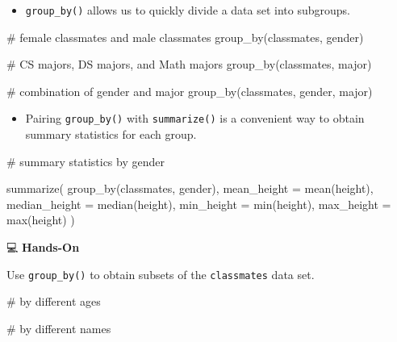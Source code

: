 \documentclass[
  letterpaper,
  DIV=11,
  numbers=noendperiod]{scrreprt}
\newenvironment{Shaded}{\begin{snugshade}}{\end{snugshade}}
\newcommand{\AttributeTok}[1]{\textcolor[rgb]{0.40,0.45,0.13}{#1}}
\newcommand{\CommentTok}[1]{\textcolor[rgb]{0.37,0.37,0.37}{#1}}
\newcommand{\FunctionTok}[1]{\textcolor[rgb]{0.28,0.35,0.67}{#1}}
\newcommand{\NormalTok}[1]{\textcolor[rgb]{0.00,0.23,0.31}{#1}}
\providecommand{\tightlist}{%
  \setlength{\itemsep}{0pt}\setlength{\parskip}{0pt}}\usepackage{longtable,booktabs,array}
\begin{document}
\begin{itemize}
\tightlist
\item
  \texttt{group\_by()} allows us to quickly divide a data set into
  subgroups.
\end{itemize}

\begin{Shaded}
\begin{Highlighting}[]
\CommentTok{\# female classmates and male classmates}
\FunctionTok{group\_by}\NormalTok{(classmates, gender)}

\CommentTok{\# CS majors, DS majors, and Math majors}
\FunctionTok{group\_by}\NormalTok{(classmates, major)}

\CommentTok{\# combination of gender and major}
\FunctionTok{group\_by}\NormalTok{(classmates, gender, major)}
\end{Highlighting}
\end{Shaded}

\begin{itemize}
\tightlist
\item
  Pairing \texttt{group\_by()} with \texttt{summarize()} is a convenient
  way to obtain summary statistics for each group.
\end{itemize}

\begin{Shaded}
\begin{Highlighting}[]
\CommentTok{\# summary statistics by gender}

\FunctionTok{summarize}\NormalTok{(}
  \FunctionTok{group\_by}\NormalTok{(classmates, gender),}
  \AttributeTok{mean\_height =} \FunctionTok{mean}\NormalTok{(height),}
  \AttributeTok{median\_height =} \FunctionTok{median}\NormalTok{(height),}
  \AttributeTok{min\_height =} \FunctionTok{min}\NormalTok{(height),}
  \AttributeTok{max\_height =} \FunctionTok{max}\NormalTok{(height)}
\NormalTok{)}
\end{Highlighting}
\end{Shaded}

💻 \textbf{Hands-On}

Use \texttt{group\_by()} to obtain subsets of the \texttt{classmates}
data set.

\begin{Shaded}
\begin{Highlighting}[]
\CommentTok{\# by different ages}

\CommentTok{\# by different names}
\end{Highlighting}
\end{Shaded}
\end{document}
